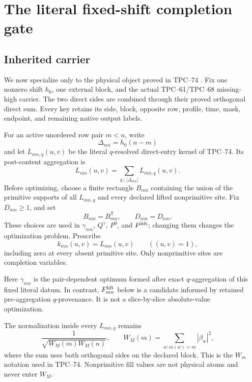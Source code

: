 \section{The literal fixed-shift completion gate}
\label{sec:physical-gate}

\subsection{Inherited carrier}

We now specialize only to the physical object proved in TPC--74
\citep{WangTPC74}.  Fix one nonzero shift \(h_0\), one external block,
and the actual TPC--61/TPC--68 missing-high carrier.  The two direct sides
are combined through their proved orthogonal direct sum.  Every key
retains its side, block, opposite row, profile, time, mask, endpoint, and
remaining native output labels.

For an active unordered row pair \(m<n\), write
\[
 \Delta_{mn}=h_0(n-m)
\]
and let \(L_{mn,q}(u,v)\) be the literal \(q\)-resolved direct-entry
kernel of TPC--74.  Its post-content aggregation is
\[
 L_{mn}(u,v)
 =
 \sum_{q\mid|\Delta_{mn}|}L_{mn,q}(u,v).
\]
Before optimizing, choose a finite rectangle \(B_{mn}\) containing the
union of the primitive supports of all \(L_{mn,q}\) and every declared
lifted nonprimitive site.  Fix \(D_{mn}\ge1\), and set
\[
 B_{nm}=B_{mn}^{\mathsf T},
 \qquad
 D_{nm}=D_{mn}.
\]
These choices are used in \(\gamma_{mn}\), \(Q^\gamma\), \(P^0\), and
\(P^{\rm lift}\); changing them changes the optimization problem.
Prescribe
\begin{equation}
 k_{mn}(u,v)=L_{mn}(u,v)
 \qquad((u,v)=1),
 \label{eq:physical-primitive-data}
\end{equation}
including zero at every absent primitive site.  Only nonprimitive sites
are completion variables.

Here \(\gamma_{mn}\) is the pair-dependent optimum formed after exact
\(q\)-aggregation of this fixed literal datum.  In contrast,
\(F^{\rm lift}_{mn}\) below is a candidate informed by retained
pre-aggregation \(q\)-provenance.  It is not a slice-by-slice
absolute-value optimization.

The normalization inside every \(L_{mn,q}\) remains
\[
 \frac1{\sqrt{W_M(m)W_M(n)}},
 \qquad
 W_M(m)=\sum_{w:m(w)=m}|\beta_w|^2,
\]
where the sum uses both orthogonal sides on the declared block.
This is the \(W_m\) notation used in TPC--74.
Nonprimitive fill values are not physical atoms and never enter \(W_M\).


